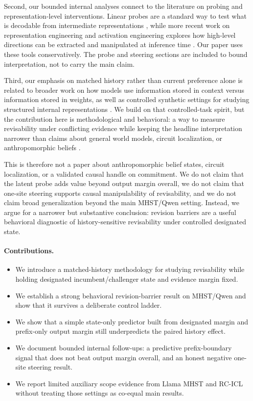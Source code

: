 Second, our bounded internal analyses connect to the literature on probing and representation-level interventions. Linear probes are a standard way to test what is decodable from intermediate representations \citep{alain2016probes,belinkov2022probing}, while more recent work on representation engineering and activation engineering explores how high-level directions can be extracted and manipulated at inference time \citep{zou2023representation,turner2023activation}. Our paper uses these tools conservatively. The probe and steering sections are included to bound interpretation, not to carry the main claim.

Third, our emphasis on matched history rather than current preference alone is related to broader work on how models use information stored in context versus information stored in weights, as well as controlled synthetic settings for studying structured internal representations \citep{chan2022contextweights,hazineh2023othello}. We build on that controlled-task spirit, but the contribution here is methodological and behavioral: a way to measure revisability under conflicting evidence while keeping the headline interpretation narrower than claims about general world models, circuit localization, or anthropomorphic beliefs \citep{bender2020climbing}.

This is therefore not a paper about anthropomorphic belief states, circuit localization, or a validated causal handle on commitment. We do not claim that the latent probe adds value beyond output margin overall, we do not claim that one-site steering supports causal manipulability of revisability, and we do not claim broad generalization beyond the main MHST/Qwen setting. Instead, we argue for a narrower but substantive conclusion: revision barriers are a useful behavioral diagnostic of history-sensitive revisability under controlled designated state.

\paragraph{Contributions.}
\begin{itemize}
    \item We introduce a matched-history methodology for studying revisability while holding designated incumbent/challenger state and evidence margin fixed.
    \item We establish a strong behavioral revision-barrier result on MHST/Qwen and show that it survives a deliberate control ladder.
    \item We show that a simple state-only predictor built from designated margin and prefix-only output margin still underpredicts the paired history effect.
    \item We document bounded internal follow-ups: a predictive prefix-boundary signal that does not beat output margin overall, and an honest negative one-site steering result.
    \item We report limited auxiliary scope evidence from Llama MHST and RC-ICL without treating those settings as co-equal main results.
\end{itemize}
